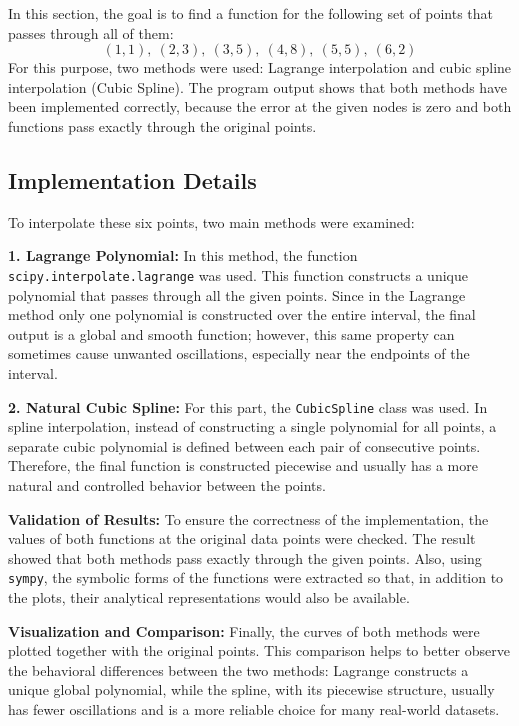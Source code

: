 \documentclass[12pt,a4paper]{article}
\begin{document}
	In this section, the goal is to find a function for the following set of points that passes through all of them:
	\[
	(1,1),\ (2,3),\ (3,5),\ (4,8),\ (5,5),\ (6,2)
	\]
	For this purpose, two methods were used: Lagrange interpolation and cubic spline interpolation
	(Cubic Spline).
	The program output shows that both methods have been implemented correctly, because the error at the given nodes is zero and both functions pass exactly through the original points.
	
	\subsection*{Implementation Details}
	
	To interpolate these six points, two main methods were examined:
	
	\textbf{1. Lagrange Polynomial:}
	In this method, the function
	\texttt{scipy.interpolate.lagrange}
	was used. This function constructs a unique polynomial that passes through all the given points. Since in the Lagrange method only one polynomial is constructed over the entire interval, the final output is a global and smooth function; however, this same property can sometimes cause unwanted oscillations, especially near the endpoints of the interval.
	
	\textbf{2. Natural Cubic Spline:}
	For this part, the
	\texttt{CubicSpline}
	class was used. In spline interpolation, instead of constructing a single polynomial for all points, a separate cubic polynomial is defined between each pair of consecutive points. Therefore, the final function is constructed piecewise and usually has a more natural and controlled behavior between the points.
	
	\textbf{Validation of Results:}
	To ensure the correctness of the implementation, the values of both functions at the original data points were checked. The result showed that both methods pass exactly through the given points. Also, using
	\texttt{sympy},
	the symbolic forms of the functions were extracted so that, in addition to the plots, their analytical representations would also be available.
	
	\textbf{Visualization and Comparison:}
	Finally, the curves of both methods were plotted together with the original points. This comparison helps to better observe the behavioral differences between the two methods: Lagrange constructs a unique global polynomial, while the spline, with its piecewise structure, usually has fewer oscillations and is a more reliable choice for many real-world datasets.
		\newpage
\end{document}
